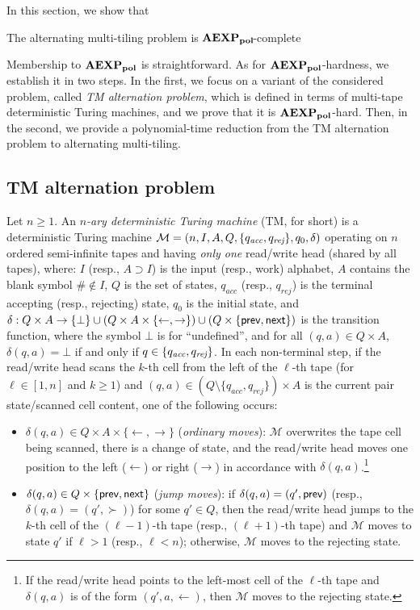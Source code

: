 In this section, we show that 
\begin{theorem*}[\ref{theo:ComplexityAlternatingMT}] $\!\!$The alternating multi-tiling problem is $\mathbf{AEXP_{pol}}\!$-complete
\end{theorem*}
Membership to $\mathbf{AEXP_{pol}}$ is straightforward.
As for $\mathbf{AEXP_{pol}}$-hardness, we establish it in two steps. In the first, we focus on a variant of the considered problem,
called \emph{TM alternation problem}, which is defined in terms of  multi-tape deterministic Turing machines, and we prove that it is
$\mathbf{AEXP_{pol}}$-hard. Then, in the second, we provide a polynomial-time reduction from the TM alternation problem to alternating multi-tiling.

\subsection{TM alternation problem}

Let $n\geq 1$. An \emph{$n$-ary deterministic Turing machine} (TM, for short) is a deterministic Turing machine $\mathcal{M}=(n,I,A,Q, \{q_{\textit{acc}},q_{\textit{rej}}\},q_0,\delta)$ operating on $n$ ordered semi-infinite tapes and having \emph{only one} read/write head (shared by all tapes), where: $I$ (resp., $A\supset I$) is  the input (resp., work) alphabet,   $A$ contains the blank symbol $\#\notin I$, $Q$ is the set of states, $q_{\textit{acc}}$ (resp., $q_{\textit{rej}}$) is the terminal accepting (resp., rejecting) state,
$q_0$ is the initial state, and $\delta:Q\times A \to \{\bot\}\cup  (Q\times A\times \{\leftarrow,\rightarrow\})\cup (Q\times\{\text{{\sffamily prev}},\text{{\sffamily next}}\})$ is the transition function, where the symbol $\bot$ is for ``undefined'', and for all $(q,a)\in Q\times A$, $\delta(q,a)=\bot$ if and only if $q\in\{q_{\textit{acc}},q_{\textit{rej}}\}$. In each non-terminal step,
if the read/write head scans the $k$-th cell from the left of the $\ell$-th tape (for $\ell\in [1,n]$ and $k\geq 1$) and $(q,a)\in (Q\setminus\{q_{acc},q_{rej}\})\times A$ is the current pair state/scanned cell content, one of the following occurs:
\begin{itemize}
  \item $\delta(q,a)\in Q\times A\times \{\leftarrow,\rightarrow\}$ (\emph{ordinary moves}):
  $\mathcal{M}$ overwrites the tape cell being scanned, there is a change of state, and the read/write
      head moves one position to the left ($\leftarrow$) or right ($\rightarrow$) in accordance with $\delta(q,a)$.\footnote{If the read/write head points to the left-most cell of the $\ell$-th tape and $\delta(q,a)$ is of the form $(q',a,\leftarrow)$, then $\mathcal{M}$ moves to the rejecting state.}
  \item $\delta(q,a)\in Q \times\{\text{{\sffamily prev}},\text{{\sffamily next}}\}$ (\emph{jump moves}):  if $\delta(q,a)=(q',\text{{\sffamily prev}})$ (resp., $\delta(q,a)=(q',\succ)$) for some $q'\in Q$, then the read/write head jumps to the $k$-th cell of the $(\ell-1)$-th tape (resp., $(\ell+1)$-th tape) and $\mathcal{M}$ moves to state $q'$ if $\ell>1$ (resp., $\ell<n$); otherwise, $\mathcal{M}$ moves to the rejecting state.
\end{itemize}

